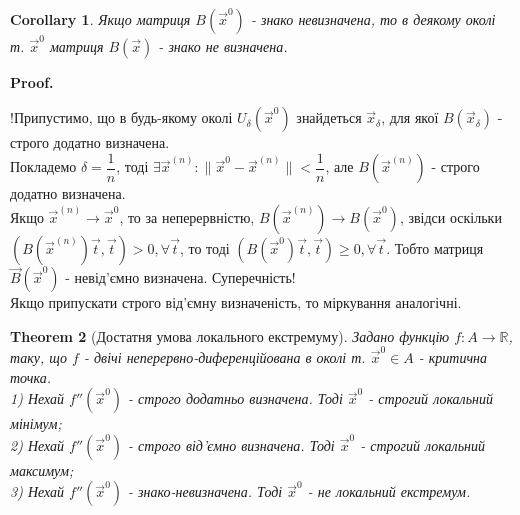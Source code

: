 \documentclass[a4paper, 10pt]{article}
\makeatletter
\def\qed{$\blacksquare$}
\theoremstyle{theoremdd}
\newtheorem{theorem}{Theorem}[subsection]
\theoremstyle{theoremdd}
\theoremstyle{theoremdd}
\theoremstyle{theoremdd}
\theoremstyle{theoremdd}
\theoremstyle{theoremdd}
\theoremstyle{theoremdd}
\theoremstyle{theoremdd}
\newtheorem{corollary}[theorem]{Corollary}
\renewenvironment{proof}[1][Proof.\\]{\par
\pushQED{\hfill \qed}%
\normalfont \topsep6\p@\@plus6\p@\relax
\trivlist
\item\relax
{\bfseries
#1\@addpunct{.}}\hspace\labelsep\ignorespaces
}{%
\popQED\endtrivlist\@endpefalse
}
\newcommand\Norm[1]{\lVert#1\rVert}
\makeatother
\begin{document}
\begin{corollary}
Якщо матриця $B(\vec{x}^0)$ - знако невизначена, то в деякому околі т. $\vec{x}^0$ матриця $B(\vec{x})$ - знако не визначена.
\end{corollary}

\begin{proof}
!Припустимо, що в будь-якому околі $U_\delta (\vec{x}^0)$ знайдеться $\vec{x}_\delta$, для якої $B(\vec{x}_\delta)$ - строго додатно визначена.\\
Покладемо $\delta = \dfrac{1}{n}$, тоді $\exists \vec{x}^{(n)}: \Norm{\vec{x}^0 - \vec{x}^{(n)}} < \dfrac{1}{n}$, але $B(\vec{x}^{(n)})$ - строго додатно визначена.\\
Якщо $\vec{x}^{(n)} \to \vec{x}^{0}$, то за неперервністю, $B(\vec{x}^{(n)}) \to B(\vec{x}^0)$, звідси оскільки $(B(\vec{x}^{(n)}) \vec{t}, \vec{t}) > 0, \forall \vec{t}$, то тоді $(B(\vec{x}^{0}) \vec{t}, \vec{t}) \geq 0, \forall \vec{t}$. Тобто матриця $\vec{B}(\vec{x}^0)$ - невід'ємно визначена. Суперечність!\\
Якщо припускати строго від'ємну визначеність, то міркування аналогічні.
\end{proof}


\begin{theorem}[Достатня умова локального екстремуму]
Задано функцію $f: A \to \mathbb{R}$, таку, що $f$ - двічі неперервно-диференційована в околі т. $\vec{x}^0 \in A$ - критична точка.\\
1) Нехай $f''(\vec{x}^0)$ - строго додатньо визначена. Тоді $\vec{x}^0$ - строгий локальний мінімум;\\
2) Нехай $f''(\vec{x}^0)$ - строго від'ємно визначена. Тоді $\vec{x}^0$ - строгий локальний максимум;\\
3) Нехай $f''(\vec{x}^0)$ - знако-невизначена. Тоді $\vec{x}^0$ - не локальний екстремум.
\end{theorem}
\end{document}
